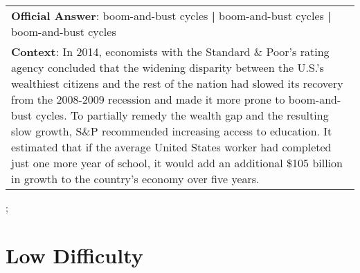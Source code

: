 \begin{figure*}[ht]
{\begin{tabular}{p{}}
            \textbf{Official Answer}: boom-and-bust cycles \textbf{|} boom-and-bust cycles \textbf{|} boom-and-bust cycles                                                                                                                                                                                                                                                                                                                                                                                                                                                                                                 \\
            \textbf{Context}: In 2014, economists with the Standard \& Poor's rating agency concluded that the widening disparity between the U.S.'s wealthiest citizens and the rest of the nation had slowed its recovery from the 2008-2009 recession and made it more prone to boom-and-bust cycles. To partially remedy the wealth gap and the resulting slow growth, S\&P recommended increasing access to education. It estimated that if the average United States worker had completed just one more year of school, it would add an additional \$105 billion in growth to the country's economy over five years. \\
        \end{tabular}
    };
    \label{fig:ex-5729e1e36aef0514001550be}
\end{figure*}

\clearpage

\section{Low Difficulty}

